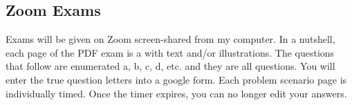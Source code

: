 \subsection*{Zoom Exams}

Exams will be given on Zoom screen-shared from my computer. In a nutshell, each page of the PDF exam is a  with text and/or illustrations. The questions that follow are enumerated a, b, c, d, etc. and they are all  questions. You will enter the true question letters into a google form. Each problem scenario page is individually timed. Once the timer expires, you can no longer edit your answers.
